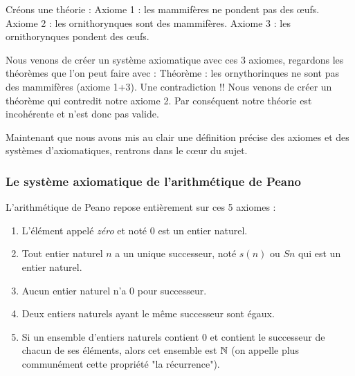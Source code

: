 \begin{example}
Créons une théorie : \newline
Axiome 1 : les mammifères ne pondent pas des œufs. \newline
Axiome 2 : les ornithorynques sont des mammifères. \newline
Axiome 3 : les ornithorynques pondent des œufs. \newline

Nous venons de créer un système axiomatique avec ces 3 axiomes, regardons les théorèmes que l'on peut faire avec : \newline
\newline
Théorème : les ornythorinques ne sont pas des mammifères (axiome 1+3). \newline
\newline
Une contradiction !! Nous venons de créer un théorème qui contredit notre axiome 2. Par conséquent notre théorie est incohérente et n'est donc pas valide.
\end{example}

Maintenant que nous avons mis au clair une définition précise des axiomes et des systèmes d'axiomatiques, rentrons dans le cœur du sujet.


\subsubsection{Le système axiomatique de l'arithmétique de Peano}
\label{sec:AxioPea}
L'arithmétique de Peano repose entièrement sur ces 5 axiomes :

\begin{enumerate}
    \item L'élément appelé \textit{zéro} et noté $0$ est un entier naturel.
    \item Tout entier naturel $n$ a un unique successeur, noté $s(n)$ ou $Sn$ qui est un entier naturel.
    \item Aucun entier naturel n'a $0$ pour successeur.
    \item Deux entiers naturels ayant le même successeur sont égaux.
    \item Si un ensemble d'entiers naturels contient $0$ et contient le successeur de chacun de ses éléments, alors cet ensemble est $\mathbb{N}$ (on appelle plus communément cette propriété "la récurrence").
\end{enumerate}

